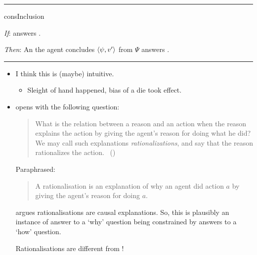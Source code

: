 \documentclass[10pt]{article}
\newcommand\lLine{{\color{lightgray} \noindent\rule{\textwidth}{0.4pt}}}
\newcommand\sepLine{
  \vfill
  \par\noindent\rule{\textwidth}{0.4pt}
  \vfill}
\newcommand{\hand}{\ding{43}}
\begin{document}
\sepLine

\begin{note}
  \begin{constraint}{consInclusion}{\issueInclusion{}}
    \mbox{ }
    \vspace{-\baselineskip}
    \begin{itenum}
    \item[\emph{If}:]
       answers \qWhy{}.
    \item[\emph{Then}:]
      An  the agent concludes \(\langle\psi, v'\rangle\) from \(\Psi\) answers \qHow{}.
    \end{itenum}
    \vspace{-\baselineskip}
  \end{constraint}
\end{note}

\lLine

\begin{note}
  \begin{itemize}
  \item
    I think this is (maybe) intuitive.
    \begin{itemize}
    \item
      Sleight of hand happened, bias of a die took effect.
    \end{itemize}
  \item
    \citeauthor{Davidson:1963aa} opens  with the following question:

    \begin{quote}
      What is the relation between a reason and an action when the reason explains the action by giving the agent's reason for doing what he did?
      We may call such explanations \emph{rationalizations}, and say that the reason rationalizes the action.%
      \mbox{ }\hfill\mbox{(\citeyear[685]{Davidson:1963aa})}
    \end{quote}

    Paraphrased:
    \begin{quote}
      A rationalisation is an explanation of why an agent did action \(a\) by giving the agent's reason for doing \(a\).
    \end{quote}
    \citeauthor{Davidson:1963aa} argues rationalisations are causal explanations.
    So, this is plausibly an instance of answer to a `why' question being constrained by answers to a `how' question.
  \item[\hand]
    Rationalisations are different from !
  \end{itemize}
\end{note}
\end{document}
